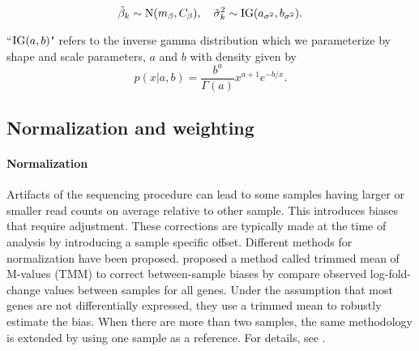 \begin{equation}
\tilde{\beta}_k \sim \operatorname{N}(m_\beta, C_\beta),\quad \tilde{\sigma}^2_k \sim \operatorname{IG}(a_{\sigma^2}, b_{\sigma^2}).
\end{equation}

``$\operatorname{IG}(a,b)$" refers to the inverse gamma distribution which we parameterize by shape and scale parameters, $a$ and $b$ with density given by
\begin{equation*}
p(x|a,b) = \frac{b^a}{\Gamma(a)}x^{a+1}e^{-b/x}.
\end{equation*}


% 
% 
% 

\subsection{Normalization and weighting}
\label{norm-weight}
\paragraph{Normalization}
Artifacts of the sequencing procedure can lead to some samples having larger or smaller read counts on average relative to other sample. This introduces biases that require adjustment. These corrections are typically made at the time of analysis by introducing a sample specific offset. Different methods for normalization have been proposed. \citet{robinson2010} proposed a method called trimmed mean of M-values (TMM) to correct between-sample biases by compare observed log-fold-change values between samples for all genes. Under the assumption that most genes are not differentially expressed, they use a trimmed mean to robustly estimate the bias. When there are more than two samples, the same methodology is extended by using one sample as a reference. For details, see \citet{robinson2010}.

